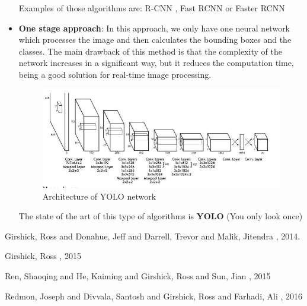 \documentclass{article}
\begin{document}
\begin{itemize}
    Examples of those algorithms are: R-CNN \cite{rcnn}, Fast RCNN \cite{fastrcnn} or Faster RCNN \cite{fasterrcnn}
    
    \item \textbf{One stage approach}: In this approach, we only have one neural network which processes the image and then calculates the bounding boxes and the classes. The main drawback of this method is that the complexity of the network increases in a significant way, but it reduces the computation time, being a good solution for real-time image processing.\\
    
    \begin{figure}[H]
        \centering
        \includegraphics[scale=0.3]{report/exam/images/yolo.png}
        \caption{Architecture of YOLO network}
        \label{fig:my_label}
    \end{figure}
    
    The state of the art of this type of algorithms is \textbf{YOLO} (You only look once)\cite{yolo}
\end{itemize}

\begin{thebibliography}{9}
   Girshick, Ross and Donahue, Jeff and Darrell, Trevor and Malik, Jitendra
    , 2014.

    Girshick, Ross
    , 2015
    
    Ren, Shaoqing and He, Kaiming and Girshick, Ross and Sun, Jian
    , 2015

    Redmon, Joseph and Divvala, Santosh and Girshick, Ross and Farhadi, Ali
    , 2016

\end{thebibliography}
\end{document}

